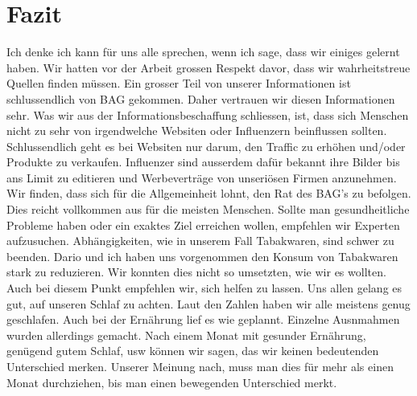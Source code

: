 \chapter{Fazit}
\authortoc{\jonas}{\chapterident}
Ich denke ich kann für uns alle sprechen, wenn ich sage, dass wir einiges gelernt haben.
\newline
Wir hatten vor der Arbeit grossen Respekt davor, dass wir wahrheitstreue Quellen finden müssen. Ein grosser Teil von unserer Informationen ist schlussendlich von BAG gekommen. Daher vertrauen wir diesen Informationen sehr.
\newline
Was wir aus der Informationsbeschaffung schliessen, ist, dass sich Menschen nicht zu sehr von irgendwelche Websiten oder Influenzern beinflussen sollten. Schlussendlich geht es bei Websiten nur darum, den Traffic zu erhöhen und/oder Produkte zu verkaufen. Influenzer sind ausserdem dafür bekannt ihre Bilder bis ans Limit zu editieren und Werbeverträge von unseriösen Firmen anzunehmen. 
\newline
Wir finden, dass sich für die Allgemeinheit lohnt, den Rat des BAG's zu befolgen. Dies reicht vollkommen aus für die meisten Menschen. Sollte man gesundheitliche Probleme haben oder ein exaktes Ziel erreichen wollen, empfehlen wir Experten aufzusuchen.
\newline
\newline
Abhängigkeiten, wie in unserem Fall Tabakwaren, sind schwer zu beenden. Dario und ich haben uns vorgenommen den Konsum von Tabakwaren stark zu reduzieren. Wir konnten dies nicht so umsetzten, wie wir es wollten. Auch bei diesem Punkt empfehlen wir, sich helfen zu lassen.
\newline
Uns allen gelang es gut, auf unseren Schlaf zu achten. Laut den Zahlen haben wir alle meistens genug geschlafen. Auch bei der Ernährung lief es wie geplannt. Einzelne Ausnmahmen wurden allerdings gemacht.
\newline
\newline
Nach einem Monat mit gesunder Ernährung, genügend gutem Schlaf, usw können wir sagen, das wir keinen bedeutenden Unterschied merken. Unserer Meinung nach, muss man dies für mehr als einen Monat durchziehen, bis man einen bewegenden Unterschied merkt.